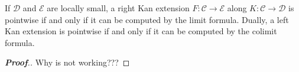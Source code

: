 \documentclass[a4paper]{article}
\date{November 9, 2023}
\begin{document}
\maketitle
\par{  If \(\mathcal{D}\) and \(\mathcal{E}\) are locally small, a right Kan extension \(F :  \mathcal{C}   \to   \mathcal{E}\) along \(K :  \mathcal{C}   \to   \mathcal{D}\) is pointwise if and only if it can be computed by the limit formula.
  Dually, a left Kan extension is pointwise if and only if it can be computed by the colimit formula.
}  \begin{proof}[{\textbf{Proof}.}]
  \par{Why is  not working???}\qedhere{}\end{proof}

\printbibliography
\end{document}
